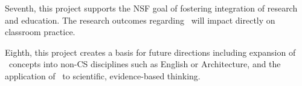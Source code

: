 Seventh, this project supports the NSF goal of fostering integration of
research and education.  The research outcomes regarding \eCT\ will impact
directly on classroom practice.

Eighth, this project creates a basis for future directions including
expansion of \eCT\ concepts into non-CS disciplines such as English or
Architecture, and the application of \eCT\ to scientific, evidence-based
thinking.








 










